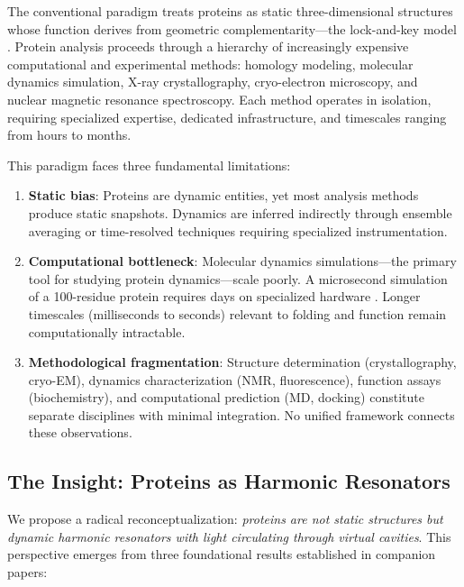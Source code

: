 \documentclass[11pt,a4paper]{article}
\begin{document}
The conventional paradigm treats proteins as static three-dimensional structures whose function derives from geometric complementarity—the lock-and-key model \cite{Fischer1894}. Protein analysis proceeds through a hierarchy of increasingly expensive computational and experimental methods: homology modeling, molecular dynamics simulation, X-ray crystallography, cryo-electron microscopy, and nuclear magnetic resonance spectroscopy. Each method operates in isolation, requiring specialized expertise, dedicated infrastructure, and timescales ranging from hours to months.

This paradigm faces three fundamental limitations:

\begin{enumerate}
\item \textbf{Static bias}: Proteins are dynamic entities, yet most analysis methods produce static snapshots. Dynamics are inferred indirectly through ensemble averaging or time-resolved techniques requiring specialized instrumentation.

\item \textbf{Computational bottleneck}: Molecular dynamics simulations—the primary tool for studying protein dynamics—scale poorly. A microsecond simulation of a 100-residue protein requires days on specialized hardware \cite{Shaw2014}. Longer timescales (milliseconds to seconds) relevant to folding and function remain computationally intractable.

\item \textbf{Methodological fragmentation}: Structure determination (crystallography, cryo-EM), dynamics characterization (NMR, fluorescence), function assays (biochemistry), and computational prediction (MD, docking) constitute separate disciplines with minimal integration. No unified framework connects these observations.
\end{enumerate}

\subsection{The Insight: Proteins as Harmonic Resonators}

We propose a radical reconceptualization: \textit{proteins are not static structures but dynamic harmonic resonators with light circulating through virtual cavities}. This perspective emerges from three foundational results established in companion papers:
\end{document}
